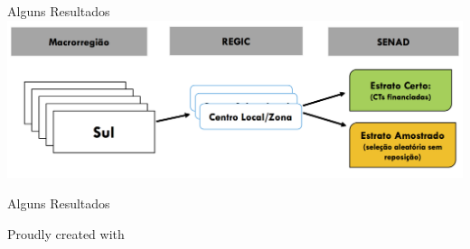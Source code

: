 \begin{frame}{Alguns Resultados}
\centering
\includegraphics[width=1\textwidth, keepaspectratio]{figures/desenho.png}
\end{frame}


\begin{frame}{Alguns Resultados}


\end{frame}



\appendix

\backupbegin

\begin{frame}[plain]
Proudly created with \LaTeXe
\end{frame}
\backupend





